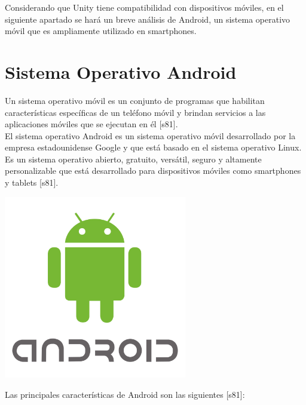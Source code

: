 Considerando que Unity tiene compatibilidad con dispositivos móviles, en el siguiente apartado se hará un breve análisis de Android, un sistema operativo móvil que es ampliamente utilizado en smartphones.\\

\section{Sistema Operativo Android}
Un sistema operativo móvil es un conjunto de programas que habilitan características específicas de un teléfono móvil y brindan servicios a las aplicaciones móviles que se ejecutan en él [s81].\\

El sistema operativo Android es un sistema operativo móvil desarrollado por la empresa estadounidense Google y que está basado en el sistema operativo Linux. Es un sistema operativo abierto, gratuito, versátil, seguro y altamente personalizable que está desarrollado para dispositivos móviles como smartphones y tablets [s81].

\begin{center}
    \includegraphics[width=0.6\textwidth]{Images/Cap 2/Android_Logo.png}
\end{center}

Las principales características de Android son las siguientes [s81]:

